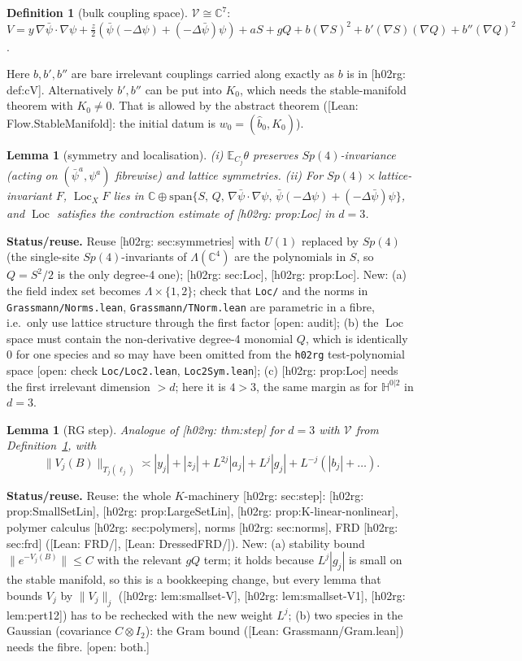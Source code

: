 \documentclass[11pt]{article}
\newtheorem{lemma}[theorem]{Lemma}
\theoremstyle{definition}
\newtheorem{definition}[theorem]{Definition}
\theoremstyle{remark}
\newcommand{\HH}{\mathbb{H}}
\newcommand{\E}{\mathbb{E}}
\newcommand{\Loc}{\operatorname{Loc}}
\newcommand{\bpsi}{\bar\psi}
\newcommand{\status}[1]{\par\smallskip\noindent\textbf{Status/reuse.} #1\par\smallskip}
\newcommand{\reuse}[1]{\textsf{[h02rg: #1]}}
\newcommand{\lean}[1]{\textsf{[Lean: #1]}}
\newcommand{\open}[1]{\textcolor{red!60!black}{\textsf{[open: #1]}}}
\begin{document}
\begin{definition}[bulk coupling space]\label{def:V}
  $\mathcal V\cong\mathbb C^{7}$: $V=y\,\nabla\bpsi\cdot\nabla\psi+\tfrac z2(\bpsi(-\Delta\psi)+(-\Delta\bpsi)\psi)
  +aS+gQ+b(\nabla S)^2+b'(\nabla S)(\nabla Q)+b''(\nabla Q)^2$.
\end{definition}
Here $b,b',b''$ are bare irrelevant couplings carried along exactly as $b$ is in \reuse{def:cV}.
Alternatively $b',b''$ can be put into $K_0$, which needs the stable-manifold theorem with
$K_0\neq0$. That is allowed by the abstract theorem (\lean{Flow.StableManifold}: the initial
datum is $w_0=(\hat b_0,K_0)$).

\begin{lemma}[symmetry and localisation]\label{lem:loc}
  (i) $\E_{C_j}\theta$ preserves $Sp(4)$-invariance (acting on $(\bpsi^a,\psi^a)$ fibrewise) and
  lattice symmetries. (ii) For $Sp(4)\times$lattice-invariant $F$, $\Loc_XF$ lies in
  $\mathbb C\oplus\mathrm{span}\{S,\,Q,\,\nabla\bpsi\cdot\nabla\psi,\,\bpsi(-\Delta\psi)+(-\Delta\bpsi)\psi\}$,
  and $\Loc$ satisfies the contraction estimate of \reuse{prop:Loc} in $d=3$.
\end{lemma}
\status{Reuse \reuse{sec:symmetries} with $U(1)$ replaced by $Sp(4)$ (the single-site
$Sp(4)$-invariants of $\Lambda(\mathbb C^4)$ are the polynomials in $S$, so $Q=S^2/2$ is
the only degree-4 one); \reuse{sec:Loc}, \reuse{prop:Loc}.
New: (a) the field index set becomes $\Lambda\times\{1,2\}$; check that
\texttt{Loc/} and the norms in \texttt{Grassmann/Norms.lean}, \texttt{Grassmann/TNorm.lean} are
parametric in a fibre, i.e.\ only use lattice structure through the first factor
\open{audit}; (b) the $\Loc$ space must contain the non-derivative degree-4 monomial $Q$,
which is identically $0$ for one species and so may have been omitted from the
\texttt{h02rg} test-polynomial space \open{check \texttt{Loc/Loc2.lean}, \texttt{Loc2Sym.lean}};
(c) \reuse{prop:Loc} needs the first irrelevant dimension $>d$; here it is $4>3$, the same
margin as for $\HH^{0|2}$ in $d=3$.}

\begin{lemma}[RG step]\label{lem:step}
  Analogue of \reuse{thm:step} for $d=3$ with $\mathcal V$ from Definition~\ref{def:V}, with
  \[
    \|V_j(B)\|_{T_j(\ell_j)}\asymp |y_j|+|z_j|+L^{2j}|a_j|+L^{j}|g_j|+L^{-j}(|b_j|+\dots).
  \]
\end{lemma}
\status{Reuse: the whole $K$-machinery \reuse{sec:step}: \reuse{prop:SmallSetLin},
\reuse{prop:LargeSetLin}, \reuse{prop:K-linear-nonlinear}, polymer calculus
\reuse{sec:polymers}, norms \reuse{sec:norms}, FRD \reuse{sec:frd} (\lean{FRD/},
\lean{DressedFRD/}). New: (a) stability bound $\|e^{-V_j(B)}\|\le C$ with the relevant $gQ$
term; it holds because $L^{j}|g_j|$ is small on the stable manifold, so this is a
bookkeeping change, but every lemma that bounds $V_j$ by $\|V_j\|_j$ (\reuse{lem:smallset-V},
\reuse{lem:smallset-V1}, \reuse{lem:pert12}) has to be rechecked with the new weight
$L^{j}$; (b) two species in the Gaussian (covariance $C\otimes I_2$): the Gram bound
(\lean{Grassmann/Gram.lean}) needs the fibre. \open{both.}}
\end{document}
